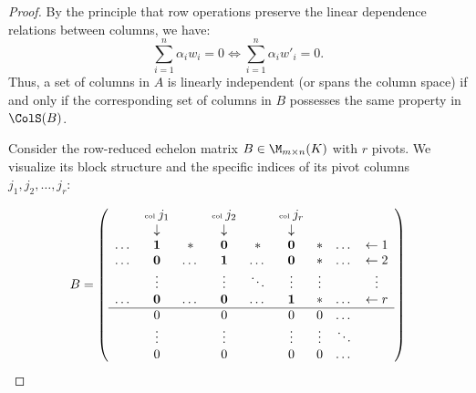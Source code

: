 \begin{proof}
By the principle that row operations preserve the linear dependence relations between columns, we have:
\[
\sum_{i=1}^n \alpha_i w_i = 0 \iff \sum_{i=1}^n \alpha_i w'_i = 0.
\]
Thus, a set of columns in $A$ is linearly independent (or spans the column space) if and only if the corresponding set of columns in $B$ possesses the same property in $\ColS(B)$.

Consider the row-reduced echelon matrix $B \in \M_{m \times n}(K)$ with $r$ pivots. We visualize its block structure and the specific indices of its pivot columns $j_1, j_2, \dots, j_r$:

\begin{equation}
\label{eq:matrix_B_rigorous}
B = \left( 
\begin{array}{ccccccccc}
 & \text{\tiny col } j_1 & & \text{\tiny col } j_2 & & \text{\tiny col } j_r & & & \\
 & \downarrow & & \downarrow & & \downarrow & & & \\
\dots & \mathbf{1} & * & \mathbf{0} & * & \mathbf{0} & * & \dots & \leftarrow 1 \\
\dots & \mathbf{0} & \dots & \mathbf{1} & \dots & \mathbf{0} & * & \dots & \leftarrow 2 \\
 & \vdots & & \vdots & \ddots & \vdots & \vdots & & \vdots \\
\dots & \mathbf{0} & \dots & \mathbf{0} & \dots & \mathbf{1} & * & \dots & \leftarrow r \\ \hline
 & 0 & & 0 & & 0 & 0 & \dots & \\
 & \vdots & & \vdots & & \vdots & \vdots & \ddots & \\
 & 0 & & 0 & & 0 & 0 & \dots & 
\end{array} 
\right)
\end{equation}


\end{proof}
